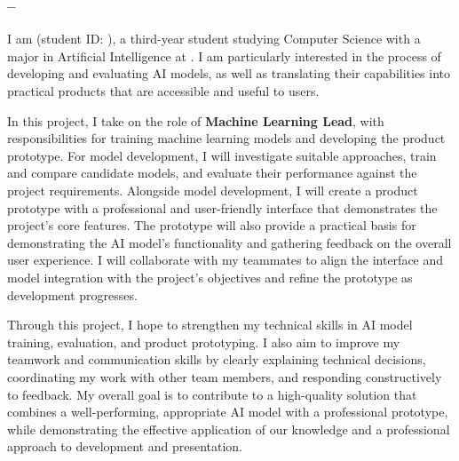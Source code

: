 \subsubsection{\memberFour{} -- \memberFourDiscipline}

I am \memberFour{}{} (student ID: \memberFourID), a third-year student studying Computer Science with a major in Artificial Intelligence at \institution. I am particularly interested in the process of developing and evaluating AI models, as well as translating their capabilities into practical products that are accessible and useful to users.

In this project, I take on the role of \textbf{Machine Learning Lead}, with responsibilities for training machine learning models and developing the product prototype. For model development, I will investigate suitable approaches, train and compare candidate models, and evaluate their performance against the project requirements. Alongside model development, I will create a product prototype with a professional and user-friendly interface that demonstrates the project's core features. The prototype will also provide a practical basis for demonstrating the AI model's functionality and gathering feedback on the overall user experience. I will collaborate with my teammates to align the interface and model integration with the project's objectives and refine the prototype as development progresses.

Through this project, I hope to strengthen my technical skills in AI model training, evaluation, and product prototyping. I also aim to improve my teamwork and communication skills by clearly explaining technical decisions, coordinating my work with other team members, and responding constructively to feedback. My overall goal is to contribute to a high-quality solution that combines a well-performing, appropriate AI model with a professional prototype, while demonstrating the effective application of our knowledge and a professional approach to development and presentation.
